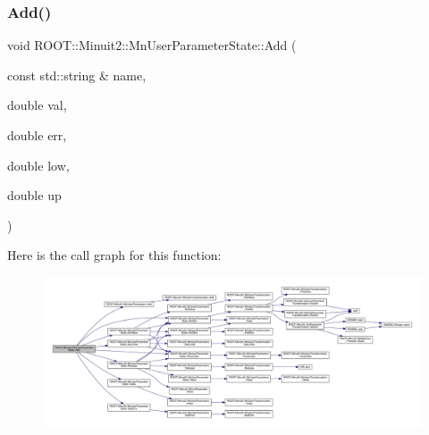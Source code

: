 \mbox{\label{classROOT_1_1Minuit2_1_1MnUserParameterState_a3cdf26ae6585812a59b84dd72d7aac51}} 
\subsubsection{\texorpdfstring{Add()}{Add()}\hspace{0.1cm}{\footnotesize\ttfamily [3/6]}}
{\footnotesize\ttfamily void R\+O\+O\+T\+::\+Minuit2\+::\+Mn\+User\+Parameter\+State\+::\+Add (\begin{DoxyParamCaption}\item[{const std\+::string \&}]{name,  }\item[{double}]{val,  }\item[{double}]{err,  }\item[{double}]{low,  }\item[{double}]{up }\end{DoxyParamCaption})}

Here is the call graph for this function\+:\nopagebreak
\begin{figure}[H]
\begin{center}
\leavevmode
\includegraphics[width=350pt]{d3/de0/classROOT_1_1Minuit2_1_1MnUserParameterState_a3cdf26ae6585812a59b84dd72d7aac51_cgraph}
\end{center}
\end{figure}
\mbox{\label{classROOT_1_1Minuit2_1_1MnUserParameterState_a3cdf26ae6585812a59b84dd72d7aac51}} 
